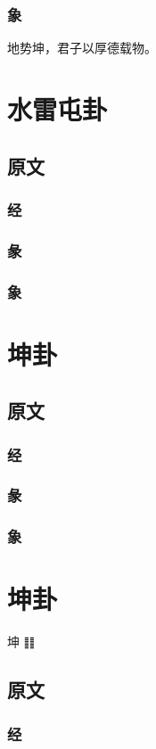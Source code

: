 \documentclass[12pt,oneside]{book}
\begin{document}
\subsection{象}
地势坤，君子以厚德载物。


\chapter{水雷屯卦}
\section{原文}
\subsection{经}
\subsection{彖}
\subsection{象}

\chapter{坤卦}

\section{原文}
\subsection{经}
\subsection{彖}
\subsection{象}

\chapter{坤卦}
坤 ䷁

\section{原文}
\subsection{经}
\end{document}

